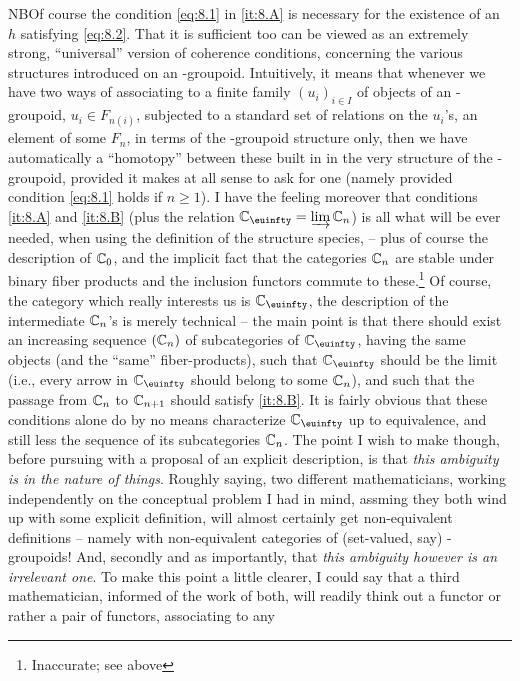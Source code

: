 NB\enspace Of course the condition \eqref{eq:8.1} in \ref{it:8.A} is necessary for the
existence of an $h$ satisfying \eqref{eq:8.2}. That it is sufficient
too can be viewed as an extremely strong, ``universal'' version of
coherence conditions, concerning the various structures introduced on
an \oo-groupoid. Intuitively, it means that whenever we have two ways
of associating to a finite family $(u_i)_{i\in I}$ of objects of an
\oo-groupoid, $u_i\in F_{n(i)}$, subjected to a standard set of
relations on the $u_i$'s, an element of some $F_n$, in terms of the
\oo-groupoid structure only, then we have automatically a ``homotopy''
between these built in in the very structure of the \oo-groupoid,
provided it makes at all sense to ask for one (namely provided
condition \eqref{eq:8.1} holds if $n \ge 1$). I have the feeling
moreover that conditions \ref{it:8.A} and \ref{it:8.B} (plus the
relation $\bC_\oo = \varinjlim \bC_n$) is all what will be ever
needed, when using the definition of the structure species, -- plus of
course the description of ${\mathbb{C}}_0$, and the implicit fact that the
categories ${\mathbb{C}}_n$ are stable under binary fiber products and the
inclusion functors commute to these.\footnote{Inaccurate; see above}
Of course, the category which really interests us is $\bC_\oo$, the
description of the intermediate ${\mathbb{C}}_n$'s is merely technical --
the main point is that there should exist an increasing sequence
$({\mathbb{C}}_n)$ of subcategories of $\bC_\oo$, having the same objects (and
the ``same'' fiber-products), such that $\bC_\oo$ should be the
limit (i.e., every arrow in $\bC_\oo$ should belong to some ${\mathbb{C}}_n$),
and such that the passage from ${\mathbb{C}}_n$ to ${\mathbb{C}}_{n+1}$
should satisfy \ref{it:8.B}. It is fairly obvious that these
conditions alone do by no means characterize $\bC_\oo$ up to
equivalence, and still less the sequence of its subcategories ${\mathbb{C}}_n$.
The point I wish to make though, before pursuing with a proposal
of an explicit description, is that \emph{this ambiguity is in the
  nature of things}. Roughly saying, two different mathematicians,
working independently on the conceptual problem I had in mind, assming
they both wind up with some explicit definition, will almost certainly
get non-equivalent definitions -- namely with non-equivalent
categories of (set-valued, say) \oo-groupoids! And, secondly and as
importantly, that \emph{this ambiguity however is an
  irrelevant one}. To make this point a little clearer, I could say
that a third mathematician, informed of the work of both, will readily
think out a functor or rather a pair of functors, associating to any
